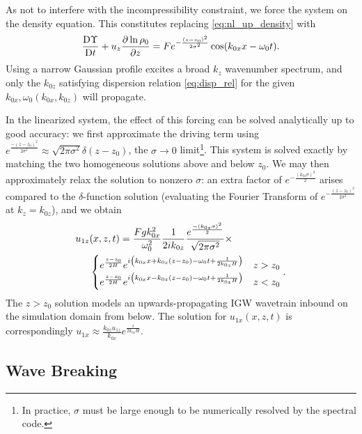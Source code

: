 \documentclass[twocolumn,
        nofootinbib, %
        usenames, %
        aps,
        prd,
        dvipsnames %
    ]{revtex4-1}%
\newcommand*{\pd}[2]{\frac{\partial#1}{\partial#2}}
\newcommand*{\md}[2]{\frac{\mathrm{D}#1}{\mathrm{D}#2}}
\DeclarePairedDelimiter\p{\lparen}{\rparen}
\begin{document}
As not to interfere with the incompressibility constraint, we force the system
on the density equation. This constitutes replacing \autoref{eq:nl_up_density}
with
\begin{equation}
    \md{\Upsilon}{t} + u_z\pd{\ln \rho_0}{z}
        = Fe^{-\frac{(z - z_0)^2}{2\sigma^2}}
            \cos \p*{k_{0x}x - \omega_0 t}.\label{eq:vol_drive}
\end{equation}
Using a narrow Gaussian profile excites a broad $k_z$ wavenumber spectrum, and
only the $k_{0z}$ satisfying dispersion relation \autoref{eq:disp_rel} for the
given $k_{0x}, \omega_0(k_{0x}, k_{0z})$ will propagate.

In the linearized system, the effect of this forcing can be solved analytically
up to good accuracy: we first approximate the driving term using
$e^{\frac{-(z - z_0)^2}{2\sigma^2}} \approx \sqrt{2\pi \sigma^2}\delta(z -
z_0)$, the $\sigma \to 0$ limit\footnote{In practice, $\sigma$ must be large
enough to be numerically resolved by the spectral code.}. This system is solved
exactly by matching the two homogeneous solutions above and below $z_0$. We may
then approximately relax the solution to nonzero $\sigma$: an extra factor of
$e^{-\frac{(k_{0z}\sigma)^2}{2}}$ arises compared to the $\delta$-function
solution (evaluating the Fourier Transform of $e^{-\frac{(z -
z_0)^2}{2\sigma^2}}$ at $k_z = k_{0z}$), and we obtain
\begin{align}
    u_{1z}&(x, z, t) ={} \frac{Fgk_{0x}^2}{\omega_0^2}
        \frac{1}{2ik_{0z}}\frac{e^{\frac{-(k_{0z}\sigma)^2}{2}}}
        {\sqrt{2\pi\sigma^2}} \times\nonumber\\
        &{}\begin{cases}
        e^{\frac{z - z_0}{2H}}e^{i\p*{k_{0x}x + k_{0z}(z - z_0) - \omega_0 t
            + \frac{1}{2k_{0z}H}}}
            & z > z_0\\
        e^{\frac{z - z_0}{2H}}e^{i\p*{k_{0x}x - k_{0z}(z - z_0) - \omega_0 t
            + \frac{1}{2k_{0z}H}}}
            & z < z_0\\
    \end{cases}.\label{eq:uz_lin}
\end{align}
The $z > z_0$ solution models an upwards-propagating IGW wavetrain inbound on
the simulation domain from below. The solution for $u_{1x}(x, z, t)$ is
correspondingly $u_{1x} \approx \frac{k_{0z} u_{1z}}{k_{0x}}e^{\frac{i}{2k_{0z}H}}$.

\subsection{Wave Breaking}
\end{document}
